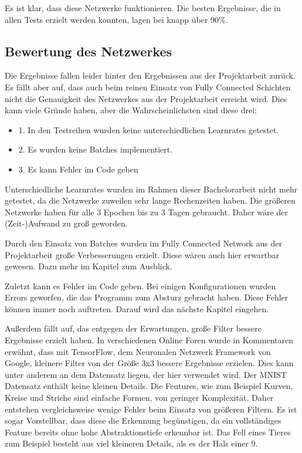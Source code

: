 \documentclass[12pt]{article}
\begin{document}
Es ist klar, dass diese Netzwerke funktionieren. Die besten Ergebnisse, die in allen Tests erzielt werden konnten, lagen bei knapp über 90\%. 

\subsection{Bewertung des Netzwerkes}
Die Ergebnisse fallen leider hinter den Ergebnissen aus der Projektarbeit zurück. Es fällt aber auf, dass auch beim reinen Einsatz von Fully Connected Schichten nicht die Genauigkeit des Netzwerkes aus der Projektarbeit erreicht wird. Dies kann viele Gründe haben, aber die Wahrscheinlichsten sind diese drei:
\begin{itemize}
\item 1. In den Testreihen wurden keine unterschiedlichen Learnrates getestet.
\item 2. Es wurden keine Batches implementiert.
\item 3. Es kann Fehler im Code geben
\end{itemize}
Unterschiedliche Learnrates wurden im Rahmen dieser Bachelorarbeit nicht mehr getestet, da die Netzwerke zuweilen sehr lange Rechenzeiten haben. Die größeren Netzwerke haben für alle 3 Epochen bis zu 3 Tagen gebraucht. Daher wäre der (Zeit-)Aufwand zu groß geworden. 

Durch den Einsatz von Batches wurden im Fully Connected Network aus der Projektarbeit große Verbesserungen erzielt. Diese wären auch hier erwartbar gewesen. Dazu mehr im Kapitel zum Ausblick.

Zuletzt kann es Fehler im Code geben. Bei einigen Konfigurationen wurden Errors geworfen, die das Programm zum Absturz gebracht haben. Diese Fehler können immer noch auftreten. Darauf wird das nächste Kapitel eingehen.

Außerdem fällt auf, das entgegen der Erwartungen, große Filter bessere Ergebnisse erzielt haben. In verschiedenen Online Foren wurde in Kommentaren erwähnt, dass mit TensorFlow, dem Neuronalen Netzwerk Framework von Google, kleinere Filter von der Größe 3x3 bessere Ergebnisse erzielen. Dies kann unter anderem an dem Datensatz liegen, der hier verwendet wird. Der MNIST Datensatz enthält keine kleinen Details. Die Feutures, wie zum Beispiel Kurven, Kreise und Striche sind einfache Formen, von geringer Komplexität. Daher entstehen vergleichsweise wenige Fehler beim Einsatz von größeren Filtern. Es ist sogar Vorstellbar, dass diese die Erkennung begünstigen, da ein vollständiges Feature bereits ohne hohe Abstraktionstiefe erkennbar ist. Das Fell eines Tieres zum Beispiel besteht aus viel kleineren Details, als es der Hals einer 9.
\end{document}
